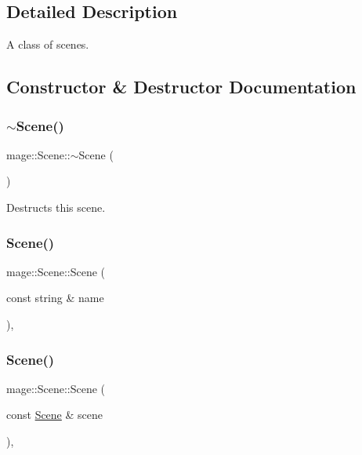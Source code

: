 \subsection{Detailed Description}
A class of scenes. 

\subsection{Constructor \& Destructor Documentation}
\hypertarget{classmage_1_1_scene_adc40910fdca62586659c2961fe7e7f3c}{}\label{classmage_1_1_scene_adc40910fdca62586659c2961fe7e7f3c} 
\subsubsection{\texorpdfstring{$\sim$\+Scene()}{~Scene()}}
{\footnotesize\ttfamily mage\+::\+Scene\+::$\sim$\+Scene (\begin{DoxyParamCaption}{ }\end{DoxyParamCaption})\hspace{0.3cm}{\ttfamily [virtual]}}

Destructs this scene. \hypertarget{classmage_1_1_scene_aab61b38547fc53aa9c5b3b559f4d2e26}{}\label{classmage_1_1_scene_aab61b38547fc53aa9c5b3b559f4d2e26} 
\subsubsection{\texorpdfstring{Scene()}{Scene()}\hspace{0.1cm}{\footnotesize\ttfamily [1/3]}}
{\footnotesize\ttfamily mage\+::\+Scene\+::\+Scene (\begin{DoxyParamCaption}\item[{const string \&}]{name }\end{DoxyParamCaption})\hspace{0.3cm}{\ttfamily [explicit]}, {\ttfamily [protected]}}

\hypertarget{classmage_1_1_scene_a88d83ccb2e10549d5370f850b2b4c228}{}\label{classmage_1_1_scene_a88d83ccb2e10549d5370f850b2b4c228} 
\subsubsection{\texorpdfstring{Scene()}{Scene()}\hspace{0.1cm}{\footnotesize\ttfamily [2/3]}}
{\footnotesize\ttfamily mage\+::\+Scene\+::\+Scene (\begin{DoxyParamCaption}\item[{const \hyperlink{classmage_1_1_scene}{Scene} \&}]{scene }\end{DoxyParamCaption})\hspace{0.3cm}{\ttfamily [protected]}, {\ttfamily [delete]}}

